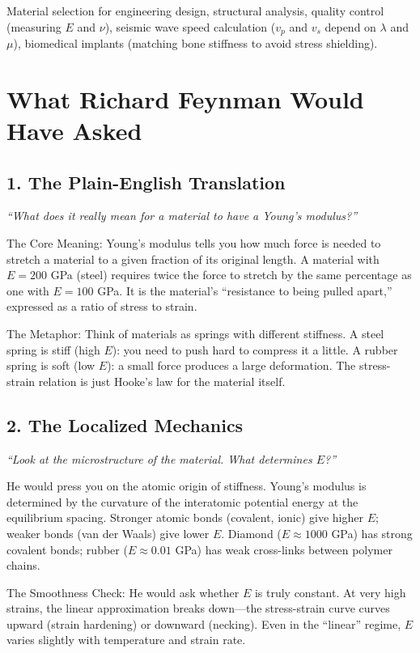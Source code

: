 \documentclass[11pt,openright]{book}
\begin{document}
Material selection for engineering design, structural analysis, quality control (measuring $E$ and $\nu$), seismic wave speed calculation ($v_p$ and $v_s$ depend on $\lambda$ and $\mu$), biomedical implants (matching bone stiffness to avoid stress shielding).
\section*{What Richard Feynman Would Have Asked}

\subsection*{1. The Plain-English Translation}
\textit{``What does it really mean for a material to have a Young's modulus?''}

The Core Meaning: Young's modulus tells you how much force is needed to stretch a material to a given fraction of its original length. A material with $E = 200$ GPa (steel) requires twice the force to stretch by the same percentage as one with $E = 100$ GPa. It is the material's ``resistance to being pulled apart,'' expressed as a ratio of stress to strain.

The Metaphor: Think of materials as springs with different stiffness. A steel spring is stiff (high $E$): you need to push hard to compress it a little. A rubber spring is soft (low $E$): a small force produces a large deformation. The stress-strain relation is just Hooke's law for the material itself.

\subsection*{2. The Localized Mechanics}
\textit{``Look at the microstructure of the material. What determines $E$?''}

He would press you on the atomic origin of stiffness. Young's modulus is determined by the curvature of the interatomic potential energy at the equilibrium spacing. Stronger atomic bonds (covalent, ionic) give higher $E$; weaker bonds (van der Waals) give lower $E$. Diamond ($E \approx 1000$ GPa) has strong covalent bonds; rubber ($E \approx 0.01$ GPa) has weak cross-links between polymer chains.

The Smoothness Check: He would ask whether $E$ is truly constant. At very high strains, the linear approximation breaks down---the stress-strain curve curves upward (strain hardening) or downward (necking). Even in the ``linear'' regime, $E$ varies slightly with temperature and strain rate.
\end{document}
